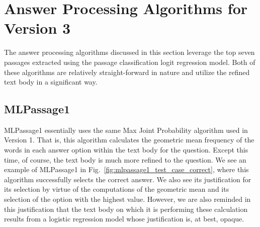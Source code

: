 \section{Answer Processing Algorithms for Version 3}

The answer processing algorithms discussed in this section leverage the top seven passages extracted using the passage classification logit regression model.  Both of these algorithms are relatively straight-forward in nature and utilize the refined text body in a significant way.  




		

		
\subsection{MLPassage1}

MLPassage1 essentially uses the same Max Joint Probability algorithm used in Version 1.  That is, this algorithm calculates the geometric mean frequency of the words in each answer option within the text body for the question.  Except this time, of course, the text body is much more refined to the question.  We see an example of MLPassage1 in Fig.~\ref{fig:mlpassage1_test_case_correct}, where this algorithm successfully selects the correct answer.  We also see its justification for its selection by virtue of the computations of the geometric mean and its selection of the option with the highest value.  However, we are also reminded in this justification that the text body on which it is performing these calculation results from a logistic regression model whose justification is, at best, opaque.  



